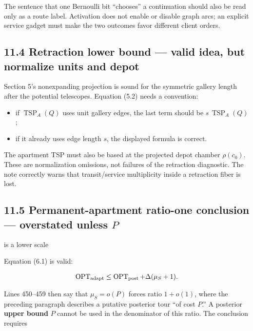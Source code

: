 \documentclass[11pt,a4paper]{article}
\begin{document}
The sentence that one Bernoulli bit “chooses” a continuation should also be read only as a route label.  Activation does not enable or disable graph arcs; an explicit service gadget must make the two outcomes favor different client orders.


\subsection*{11.4 Retraction lower bound — valid idea, but normalize units and depot}

Section 5's nonexpanding projection is sound for the symmetric gallery length after the potential telescopes.  Equation (5.2) needs a convention:


\begin{itemize}

\item if \(\operatorname{TSP}_A(Q)\) uses unit gallery edges, the last term should be \(s\,\operatorname{TSP}_A(Q)\);

\item if it already uses edge length \(s\), the displayed formula is correct.

\end{itemize}

The apartment TSP must also be based at the projected depot chamber \(\rho(c_0)\).  These are normalization omissions, not failures of the retraction diagnostic.  The note correctly warns that transit/service multiplicity inside a retraction fiber is lost.


\subsection*{11.5 Permanent-apartment ratio-one conclusion — overstated unless \(P\)}

is a lower scale


Equation (6.1) is valid:


\[
\operatorname{OPT}_{\rm adapt}
\le\operatorname{OPT}_{\rm post}+\Delta(\mu_S+1).
\]

Lines 450–459 then say that \(\mu_S=o(P)\) forces ratio \(1+o(1)\), where the preceding paragraph describes a putative posterior tour “of cost \(P\).”  A posterior \textbf{upper bound} \(P\) cannot be used in the denominator of this ratio.  The conclusion requires
\end{document}
